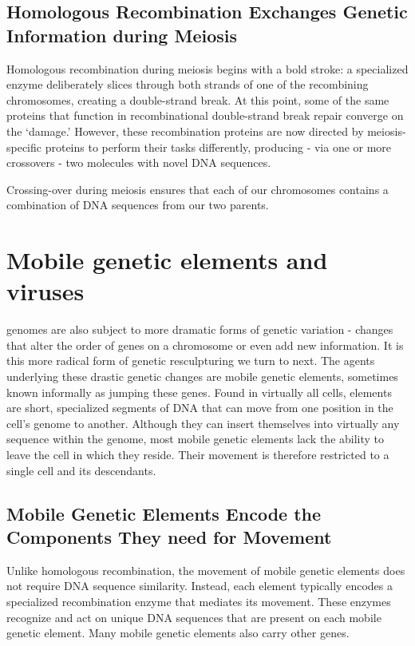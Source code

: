 \subsection{Homologous Recombination Exchanges Genetic Information during Meiosis}

Homologous recombination during meiosis begins with a bold stroke:
a specialized enzyme deliberately slices through both strands of one
of the recombining chromosomes, creating a double-strand break. At
this point, some of the same proteins that function in recombinational
double-strand break repair converge on the ‘damage.’ However, these
recombination proteins are now directed by meiosis-specific proteins to
perform their tasks differently, producing - via one or more crossovers -
two molecules with novel DNA sequences.

Crossing-over during meiosis ensures that each of our chromosomes
contains a combination of DNA sequences from our two parents.

\section{Mobile genetic elements and viruses}

genomes are also subject to more dramatic forms of genetic variation
- changes that alter the order of genes on a chromosome or even
add new information. It is this more radical form of genetic resculpturing
we turn to next. The agents underlying these drastic genetic changes
are mobile genetic elements, sometimes known informally as jumping these
genes. Found in virtually all cells,
elements are short, specialized
segments of DNA that can move from one position in the cell’s genome to
another. Although they can insert themselves into virtually any sequence
within the genome, most mobile genetic elements lack the ability to leave
the cell in which they reside. Their movement is therefore restricted to a
single cell and its descendants.

\subsection{Mobile Genetic Elements Encode the Components They need for Movement}

Unlike homologous recombination, the movement of mobile genetic elements
does not require DNA sequence similarity. Instead, each element
typically encodes a specialized recombination enzyme that mediates its
movement. These enzymes recognize and act on unique
DNA sequences that are present on each mobile genetic element. Many
mobile genetic elements also carry other genes.

